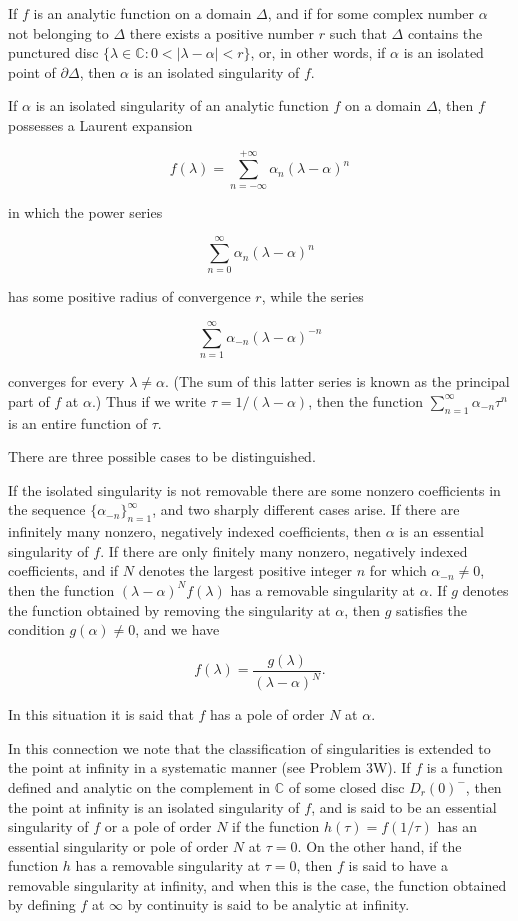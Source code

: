 If $f$ is an analytic function on a domain $\Delta$, and if for some complex number $\alpha$ not belonging to $\Delta$ there exists a positive number $r$ such that $\Delta$ contains the punctured disc $\{\lambda \in \mathbb{C}: 0 < |\lambda - \alpha| < r\}$, or, in other words, if $\alpha$ is an isolated point of $\partial \Delta$, then $\alpha$ is an isolated singularity of $f$.

If $\alpha$ is an isolated singularity of an analytic function $f$ on a domain $\Delta$, then $f$ possesses a Laurent expansion

$$f(\lambda) = \sum_{n=-\infty}^{+\infty} \alpha_n(\lambda - \alpha)^n$$

in which the power series

$$\sum_{n=0}^{\infty} \alpha_n(\lambda - \alpha)^n$$

has some positive radius of convergence $r$, while the series

$$\sum_{n=1}^{\infty} \alpha_{-n}(\lambda - \alpha)^{-n}$$

converges for every $\lambda \neq \alpha$. (The sum of this latter series is known as the principal part of $f$ at $\alpha$.) Thus if we write $\tau = 1/(\lambda - \alpha)$, then the function $\sum_{n=1}^{\infty} \alpha_{-n}\tau^n$ is an entire function of $\tau$.

There are three possible cases to be distinguished.

If the isolated singularity is not removable there are some nonzero coefficients in the sequence $\{\alpha_{-n}\}_{n=1}^{\infty}$, and two sharply different cases arise. If there are infinitely many nonzero, negatively indexed coefficients, then $\alpha$ is an essential singularity of $f$. If there are only finitely many nonzero, negatively indexed coefficients, and if $N$ denotes the largest positive integer $n$ for which $\alpha_{-n} \neq 0$, then the function $(\lambda - \alpha)^N f(\lambda)$ has a removable singularity at $\alpha$. If $g$ denotes the function obtained by removing the singularity at $\alpha$, then $g$ satisfies the condition $g(\alpha) \neq 0$, and we have

$$f(\lambda) = \frac{g(\lambda)}{(\lambda - \alpha)^N}.$$

In this situation it is said that $f$ has a pole of order $N$ at $\alpha$.

In this connection we note that the classification of singularities is extended to the point at infinity in a systematic manner (see Problem 3W). If $f$ is a function defined and analytic on the complement in $\mathbb{C}$ of some closed disc $D_r(0)^-$, then the point at infinity is an isolated singularity of $f$, and is said to be an essential singularity of $f$ or a pole of order $N$ if the function $h(\tau) = f(1/\tau)$ has an essential singularity or pole of order $N$ at $\tau = 0$. On the other hand, if the function $h$ has a removable singularity at $\tau = 0$, then $f$ is said to have a removable singularity at infinity, and when this is the case, the function obtained by defining $f$ at $\infty$ by continuity is said to be analytic at infinity.

